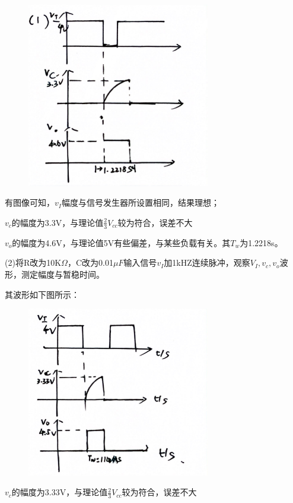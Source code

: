 \documentclass{ctexart}
\begin{document}
    \begin{figure}[htbp]
        \centering
        \includegraphics[width=8cm]{3.1.2.jpg}
    \end{figure}

    有图像可知，$v_I$幅度与信号发生器所设置相同，结果理想；

    $v_c$的幅度为3.3V，与理论值$\frac{2}{3}V_{cc}$较为符合，误差不大

    $v_o$的幅度为4.6V，与理论值5V有些偏差，与某些负载有关。其$T_w$为1.2218s。
    
    (2)将R改为10K$\Omega$，C改为0.01$\mu F$输入信号$v_I$加1kHZ连续脉冲，观察$V_I,v_c,v_o$波形，测定幅度与暂稳时间。

    其波形如下图所示：
    
    \begin{figure}[htbp]
        \centering
        \includegraphics[width=8cm]{3.1.3.jpg}
    \end{figure}



    
    $v_c$的幅度为3.33V，与理论值$\frac{2}{3}V_{cc}$较为符合，误差不大
\end{document}
